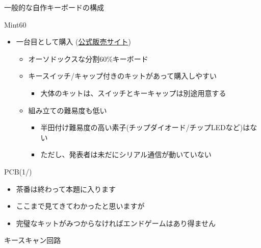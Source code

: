 \documentclass[cjk,dvipdfmx,10pt,compress,fragile%
hyperref={bookmarks=true,bookmarksnumbered=true,bookmarksopen=false,%
colorlinks=false,%
pdftitle={第 134 回 関西 Debian 勉強会},%
pdfauthor={小林},%
pdfsubject={資料},%
}]{beamer}
\begin{document}
\begin{frame}[fragile,t]{一般的な自作キーボードの構成}
\end{frame}

\begin{frame}[fragile,t]{Mint60}
 \begin{itemize}
  \item 一台目として購入 (\href{https://eucalyn.shop/shop/kits/mint60-starter}{公式販売サイト})
	\begin{itemize}
	 \item オーソドックスな分割60\%キーボード
	 \item キースイッチ/キャップ付きのキットがあって購入しやすい
	       \begin{itemize}
		\item 大体のキットは、スイッチとキーキャップは別途用意する
	       \end{itemize}
	 \item 組み立ての難易度も低い
	       \begin{itemize}
		\item 半田付け難易度の高い素子(チップダイオード/チップLEDなど)はない \pause
		\item ただし、発表者は未だにシリアル通信が動いていない
	       \end{itemize}
	\end{itemize}
 \end{itemize}
\end{frame}


\begin{frame}[fragile,t]{PCB(1/)}
 \begin{itemize}
  \item 茶番は終わって本題に入ります \pause
  \item ここまで見てきてわかったと思いますが \pause
  \item 完璧なキットがみつからなければエンドゲームはあり得ません
 \end{itemize}
\end{frame}

\begin{frame}[fragile,t]{キースキャン回路}
\end{frame}
\end{document}
